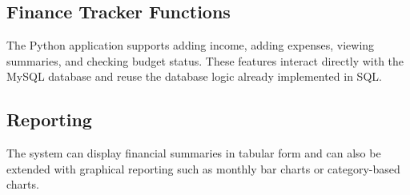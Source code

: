 \subsection{Finance Tracker Functions}
The Python application supports adding income, adding expenses, viewing summaries, and checking budget status. These features interact directly with the MySQL database and reuse the database logic already implemented in SQL.

\subsection{Reporting}
The system can display financial summaries in tabular form and can also be extended with graphical reporting such as monthly bar charts or category-based charts.

